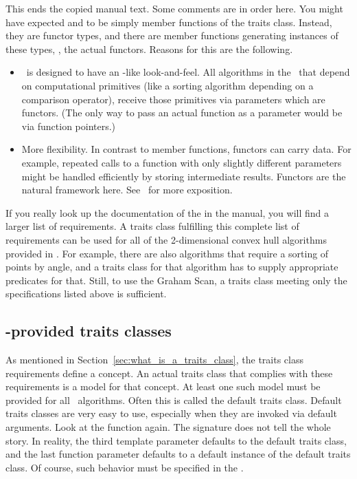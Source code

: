 This ends the copied manual text.  Some comments are in order here.
You might have expected  and  to be
simply member functions of the traits class.
 Instead, they are functor types, and
there are member functions generating instances of these types, \ie,
the actual functors. Reasons for this are the following.
\begin{itemize}
\item \cgal\ is designed to have an \stl-like look-and-feel.  All
  algorithms in the \stl\ that depend on computational primitives
  (like a sorting algorithm depending on a comparison operator),
  receive those primitives via parameters which are functors. (The
  only way to pass an actual function as a parameter would be via
  function pointers.)
\item More flexibility. In contrast to member functions, functors can
  carry data. For example, repeated calls to a function with only
  slightly different parameters might be handled efficiently by
  storing intermediate results. Functors are the natural framework
  here. See~\cite{hhkps-aegk-01} for more exposition.
\end{itemize}
If you really look up the documentation of the 
 in the manual, you will find a larger
list of requirements. 
A traits class fulfilling this complete list of requirements can be used
for all of the 2-dimensional convex hull algorithms provided in \cgal. 
For example, there are also
algorithms that require a sorting of points by angle, and a traits class for
that algorithm has to supply appropriate predicates for that. Still, to use
the Graham Scan, a traits class meeting only the specifications listed above
is sufficient.

\subsection{\cgal-provided traits classes}
\label{subsec:cgal_traits_classes}

As mentioned in Section~\ref{sec:what_is_a_traits_class},
the traits class requirements define a concept. An
actual traits class that complies with these requirements is a model for
that concept. At least one such model must be provided for all \cgal\ 
algorithms.
Often this is called the default traits class.%
Default traits classes are very
easy to use, especially when they are invoked via default arguments.
Look at the function  
again. The signature does not
tell the whole story. In reality, the third template parameter defaults
to the default traits class, and the last function parameter defaults to
a default instance of the default traits class. Of course, such behavior
must be specified in the .
\ccIndexSubitem{documentation}{of default traits class}

